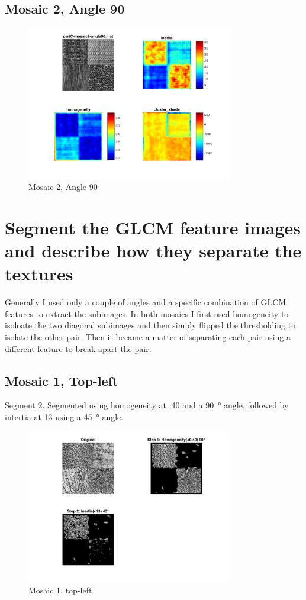 \documentclass[a4paper,12pt,titlepage]{article}
\begin{document}
\subsection{Mosaic 2, Angle 90}
\begin{figure}[H]
\includegraphics[width=0.8\textwidth]{partC-mosaic2-angle90}
\caption{Mosaic 2, Angle 90}
\label{fig:Mosaic2Angle90}
\end{figure}

\section{Segment the GLCM feature images and describe how they separate the textures}

Generally I used only a couple of angles and a specific combination of GLCM features to extract the subimages. In both mosaics I first used homogeneity to isoloate the two diagonal subimages and then simply flipped the thresholding to isolate the other pair. Then it became a matter of separating each pair using a different feature to break apart the pair.

\subsection*{Mosaic 1, Top-left}
Segment \ref{fig:Mosaic1SegmentedTopLeft}. Segmented using homogeneity at .40 and a \SI{90}{\degree} angle, followed by intertia at 13 using a \SI{45}{\degree} angle.

\begin{figure}[H]
	\includegraphics[width=0.8\textwidth]{partD-mosaic1-segmentation-top-left}
	\caption{Mosaic 1, top-left}
	\label{fig:Mosaic1SegmentedTopLeft}
\end{figure}
\end{document}
